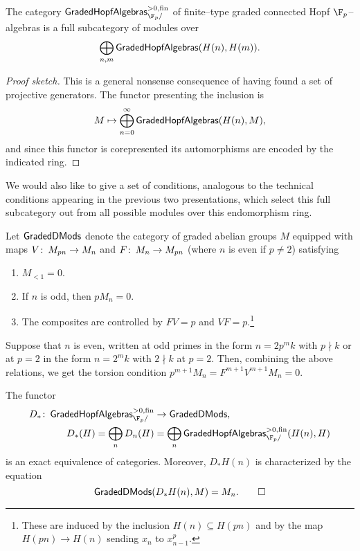 \begin{corollary}
The category $\CatOf{GradedHopfAlgebras}^{> 0, \fin}_{\F_p/}$ of finite--type graded connected Hopf $\F_p$--algebras is a full subcategory of modules over \[\bigoplus_{n, m} \mathsf{GradedHopfAlgebras}(H(n), H(m)).\]
\end{corollary}
\begin{proof}[Proof sketch]
This is a general nonsense consequence of having found a set of projective generators.  The functor presenting the inclusion is \[M \mapsto \bigoplus_{n=0}^\infty \mathsf{GradedHopfAlgebras}(H(n), M),\] and since this functor is corepresented its automorphisms are encoded by the indicated ring.
\end{proof}

We would also like to give a set of conditions, analogous to the technical conditions appearing in the previous two presentations, which select this full subcategory out from all possible modules over this endomorphism ring.

\begin{definition}
Let $\mathsf{GradedDMods}$ denote the category of graded abelian groups $M$ equipped with maps $V\colon\thinspace M_{pn} \to M_n$ and $F\colon\thinspace M_n \to M_{pn}$ (where $n$ is even if $p \ne 2$) satisfying
\begin{enumerate}
\item $M_{< 1} = 0$.
\item If $n$ is odd, then $pM_n = 0$.
\item The composites are controlled by $FV = p$ and $VF = p$.\footnote{These are induced by the inclusion $H(n) \subseteq H(pn)$ and by the map $H(pn) \to H(n)$ sending $x_n$ to $x_{n-1}^p$.}
\end{enumerate}
\end{definition}

\begin{remark}
Suppose that $n$ is even, written at odd primes in the form $n = 2p^m k$ with $p \nmid k$ or at $p = 2$ in the form $n = 2^m k$ with $2 \nmid k$ at $p = 2$.  Then, combining the above relations, we get the torsion condition $p^{m+1} M_n = F^{m+1} V^{m+1} M_n = 0$.
\end{remark}

\begin{theorem}
The functor
\begin{align*}
D_*\co \CatOf{GradedHopfAlgebras}^{>0, \fin}_{\F_p/} & \to \CatOf{GradedDMods}, \\
D_*(H) = \bigoplus_n D_n(H) & = \bigoplus_n \CatOf{GradedHopfAlgebras}^{>0, \fin}_{\F_p/}(H(n), H)
\end{align*}
is an exact equivalence of categories.  Moreover, $D_* H(n)$ is characterized by the equation \[\mathsf{GradedDMods}(D_* H(n), M) = M_n. \qed\]
\end{theorem}

